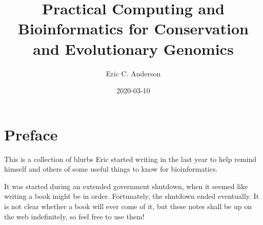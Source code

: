 \documentclass[]{krantz}
\title{Practical Computing and Bioinformatics for Conservation and Evolutionary Genomics}
\author{Eric C. Anderson}
\date{2020-03-10}
\begin{document}
\maketitle


\thispagestyle{empty}

\begin{center}

\end{center}

\setlength{\abovedisplayskip}{-5pt}
\setlength{\abovedisplayshortskip}{-5pt}

{
\hypersetup{linkcolor=}
\setcounter{tocdepth}{2}
\tableofcontents
}
\listoftables
\listoffigures
\newcommand{\bitsfa}{{\circ}{\circ}{\circ}{\bullet}}
\newcommand{\bitsfb}{{\circ}{\circ}{\bullet}{\circ}}
\newcommand{\bitsfc}{{\circ}{\bullet}{\circ}{\circ}}
\newcommand{\bitsfd}{{\bullet}{\circ}{\circ}{\circ}}
\newcommand{\bitsopen}{{\circ}{\circ}{\circ}{\circ}}

\newcommand{\bitsa}{\bitsopen~\bitsopen~\bitsfa}
\newcommand{\bitsb}{\bitsopen~\bitsopen~\bitsfb}
\newcommand{\bitsc}{\bitsopen~\bitsopen~\bitsfc}
\newcommand{\bitsd}{\bitsopen~\bitsopen~\bitsfd}

\newcommand{\bitse}{\bitsopen~\bitsfa~\bitsopen}
\newcommand{\bitsf}{\bitsopen~\bitsfb~\bitsopen}
\newcommand{\bitsg}{\bitsopen~\bitsfc~\bitsopen}
\newcommand{\bitsh}{\bitsopen~\bitsfd~\bitsopen}

\newcommand{\bitsi}{\bitsfa~\bitsopen~\bitsopen}
\newcommand{\bitsj}{\bitsfb~\bitsopen~\bitsopen}
\newcommand{\bitsk}{\bitsfc~\bitsopen~\bitsopen}
\newcommand{\bitsl}{\bitsfd~\bitsopen~\bitsopen}
\newcommand{\bitsmany}{\bitsopen~{\circ}{\bullet}{\circ}{\bullet}~{\circ}{\circ}{\bullet}{\bullet}}

\hypertarget{preface}{%
\chapter*{Preface}\label{preface}}


This is a collection of blurbs Eric started writing in the last year to
help remind himself and others of some useful things to know for bioinformatics.

It was started during an extended government shutdown, when it seemed like writing a book
might be in order. Fortunately, the shutdown ended eventually. It is not clear whether a
book will ever come of it, but these notes shall be up on the web indefinitely, so feel free to use
them!
\end{document}
